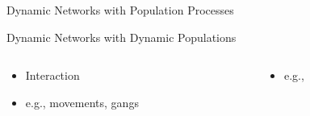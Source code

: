 \documentclass[10pt]{beamer}
\begin{document}
\begin{frame}[t]{Dynamic Networks with Population Processes}
{\begin{block}{Dynamic Networks with Dynamic Populations}
\begin{itemize}
\begin{columns}[t]
\begin{column}{0.4\textwidth}
\begin{itemize}
\item Interaction
\item e.g., movements, gangs
\end{itemize}
\end{column}
\begin{column}{0.4\textwidth}
\begin{itemize}
\item e.g.,   \citet{freeman88,freeman92}%
\end{itemize}
\end{column}
\end{columns}
\end{itemize}
\end{block}
}
\end{frame}


\end{document}
